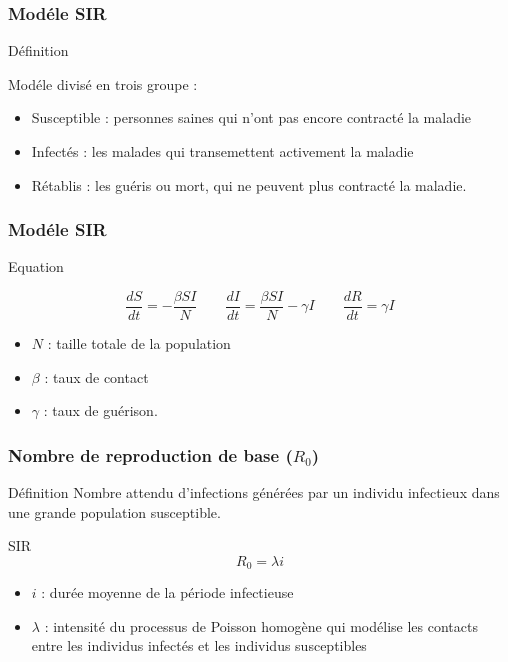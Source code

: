 \begin{frame}
        \frametitle{Modéle SIR}

        \begin{block}{Définition}

                Modéle divisé en trois groupe :
                \begin{itemize}
                        \item Susceptible : personnes saines qui n'ont pas encore contracté la maladie
                        \item Infectés : les malades qui transemettent activement la maladie
                        \item Rétablis : les guéris ou mort, qui ne peuvent plus contracté la maladie.
                \end{itemize}

        \end{block}
\end{frame}

\begin{frame}
        \frametitle{Modéle SIR}

        \begin{alertblock}{Equation}

                $$ \frac{dS}{dt} = -\frac{\beta SI}{N} \qquad \frac{dI}{dt} = \frac{\beta SI}{N} - \gamma I \qquad \frac{dR}{dt} = \gamma I $$

                \begin{itemize}
                        \item $N$ : taille totale de la population
                        \item $\beta$ : taux de contact
                        \item $\gamma$ : taux de guérison.
                \end{itemize}

        \end{alertblock}
\end{frame}

\begin{frame}
        \frametitle{Nombre de reproduction de base ($R_0$)}

        \begin{block}{Définition}
                Nombre attendu d’infections générées par un individu infectieux dans une grande population susceptible.
        \end{block}

        \begin{alertblock}{SIR}
                $$ R_0 =  \lambda i $$
                \begin{itemize}
                        \item $i$ : durée moyenne de la période infectieuse
                        \item $\lambda$ : intensité du processus de Poisson homogène qui modélise les contacts entre les individus infectés et les individus susceptibles
                \end{itemize}
        \end{alertblock}
\end{frame}
